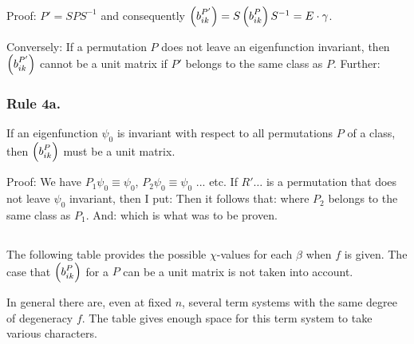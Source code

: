 \begin{paper}{1}
Proof: $P'=SPS^{-1}$ and consequently $\Aikp{b}{ik}{P'} = S\Aikp{b}{ik}{P}S^{-1} = E\cdot\gamma$.

Conversely: If a permutation $P$ does not leave an eigenfunction invariant, then $\Aikp{b}{ik}{P'}$ cannot be a unit matrix if $P'$ belongs to the same class as $P$. Further:

\subsubsection*{Rule 4a.} If an eigenfunction $\psi_0$ is invariant with respect to all permutations $P$ of a class, then $\Aikp{b}{ik}{P}$ must be a unit matrix.

Proof: We have $P_1 \psi_0 \equiv \psi_0$, $P_2 \psi_0 \equiv \psi_0$ ... etc. If $R'\dots$ is a permutation that does not leave $\psi_0$ invariant, then I put:
Then it follows that:
where $P_2$ belongs to the same class as $P_1$. And:
which is what was to be proven.

\subsection{} The following table provides the possible $\chi$-values for each $\beta$ when $f$ is given. The case that $\Aikp{b}{ik}{P}$ for a $P$ can be a unit matrix is not taken into account.

In general there are, even at fixed $n$, several term systems with the same degree of degeneracy $f$. The table gives enough space for this term system to take various characters.


\end{paper}
